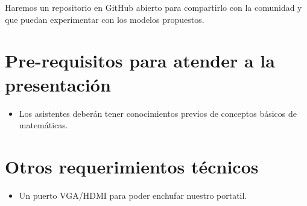 \documentclass[runningheads]{llncs}
\begin{document}
Haremos un repositorio en GitHub abierto para compartirlo con la comunidad y que puedan experimentar con los modelos propuestos.

\section{Pre-requisitos para atender a la presentación}
\begin{itemize}
\item  Los asistentes deber\'an tener conocimientos previos de conceptos básicos de matemáticas. 
\end{itemize}

\section{Otros requerimientos t\'ecnicos}
\begin{itemize}
 \item Un puerto VGA/HDMI para poder enchufar nuestro portatil.
\end{itemize}

\clearpage



\end{document}
